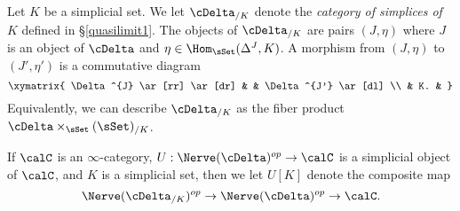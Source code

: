 \begin{notation}
Let $K$ be a simplicial set. We let $\cDelta_{/K}$ denote the {\it category of simplices of $K$} defined in \S \ref{quasilimit1}. The objects of $\cDelta_{/K}$ are pairs $(J, \eta)$ where $J$ is an object of $\cDelta$ and $\eta \in \Hom_{\sSet}( \Delta^J, K)$. A morphism from $(J, \eta)$ to $(J', \eta')$ is a commutative diagram
$$ \xymatrix{ \Delta^{J} \ar[rr] \ar[dr] & & \Delta^{J'} \ar[dl] \\
& K. & }$$
Equivalently, we can describe $\cDelta_{/K}$ as the fiber product 
$\cDelta \times_{ \sSet } (\sSet)_{/K}$.

If $\calC$ is an $\infty$-category, $U: \Nerve(\cDelta)^{op} \rightarrow \calC$ is a simplicial object of $\calC$, and $K$ is a simplicial set, then we let $U[K]$ denote the composite map
$$ \Nerve(\cDelta_{/K})^{op} \rightarrow \Nerve(\cDelta)^{op} \rightarrow \calC.$$
\end{notation}

